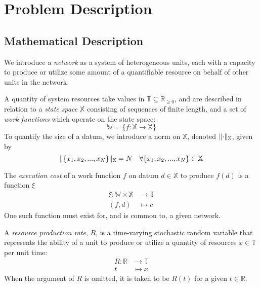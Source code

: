 \documentclass[../mthe-493-project-proposal.tex]{subfiles}
\begin{document}
    \chapter{Problem Description}
    \label{ch:problem-description}

    \section{Mathematical Description}
    \label{sec:mathematical-description}

    We introduce a \textit{network} as a system of heterogeneous units, each with a capacity to produce or utilize some amount of a quantifiable resource on behalf of other units in the network.

    A quantity of system resources take values in $\mathbb{T} \subseteq \mathbb{R}_{\geq 0}$, and are described in relation to a \textit{state space} $\mathbb{X}$ consisting of sequences of finite length, and a set of \textit{work functions} which operate on the state space:
    \begin{equation*}
        \mathbb{W} = \{f: \mathbb{X} \rightarrow \mathbb{X}\}
    \end{equation*}
    To quantify the size of a datum, we introduce a norm on $\mathbb{X}$, denoted $\lVert\cdot\rVert_{\mathbb{X}}$, given by
    \begin{equation*}
        \lVert\{x_1, x_2, ..., x_N\}\rVert_{\mathbb{X}} = N \quad \forall \{x_1, x_2, ..., x_N\} \in \mathbb{X}
    \end{equation*}

    The \textit{execution cost} of a work function $f$ on datum $d \in \mathbb{X}$ to produce $f(d)$ is a function $\xi$
    \begin{align*}
        \xi \colon \mathbb{W} \times \mathbb{X} &\to \mathbb{T} \\
        (f, d)                                  &\mapsto c
    \end{align*}
    One such function must exist for, and is common to, a given network.

    A \textit{resource production rate}, $R$, is a time-varying stochastic random variable that represents the ability of a unit to produce or utilize a quantity of resources $x \in \mathbb{T}$ per unit time:
    \begin{align*}
        R \colon \mathbb{R} &\to \mathbb{T} \\
        t                   &\mapsto x
    \end{align*}
    When the argument of $R$ is omitted, it is taken to be $R(t)$ for a given $t \in \mathbb{R}$.
\end{document}
